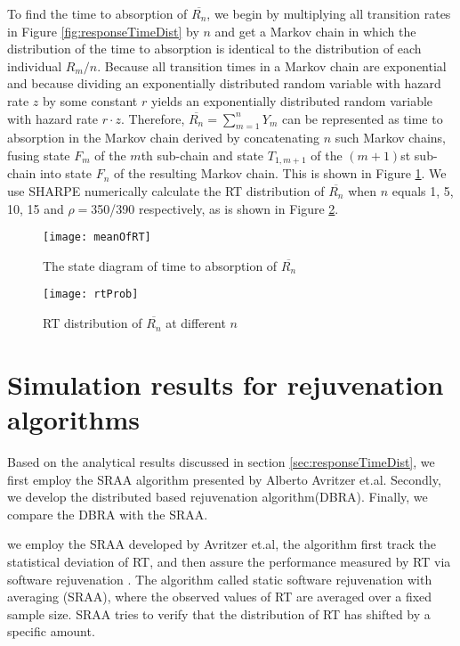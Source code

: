 \documentclass[10pt,journal,letterpaper,compsoc]{IEEEtran}
\begin{document}
To find the time to absorption of $\overline{R_n}$,
we begin by multiplying all transition rates
in Figure \ref{fig:responseTimeDist} by $n$ and get a Markov chain
in which the distribution of the time to absorption is identical to
the distribution of each individual $R_m/n$.
Because all transition times in a Markov chain are exponential and 
because dividing an exponentially distributed random variable with
hazard rate $z$ by some constant $r$ yields an exponentially distributed
random variable with hazard rate $r \cdot z$.
Therefore, $\overline{R_n}=\sum_{m=1}^nY_m$ can be represented as time
to absorption in the Markov chain derived by concatenating $n$ such
Markov chains, fusing state $F_m$ of the $m$th sub-chain and state
$T_{1,m+1}$ of the $(m+1)$st sub-chain into state $F_n$
of the resulting Markov chain.
This is shown in Figure \ref{fig:meanOfRT}.
We use SHARPE numerically calculate the RT distribution of $\overline{R_n}$
when $n$ equals 1, 5, 10, 15 and $\rho=$350/390 respectively,
as is shown in Figure \ref{fig:RTdist}.

\begin{figure}[htb]
\centering
\texttt{[image: meanOfRT]}
\caption{The state diagram of time to absorption of $\overline{R_n}$}
\label{fig:meanOfRT}
\end{figure}

\begin{figure}[htb]
\centering
\texttt{[image: rtProb]}
\caption{RT distribution of $\overline{R_n}$ at different $n$}
\label{fig:RTdist}
\end{figure}

\section{Simulation results for rejuvenation algorithms} %
\label{sec:simResults}
Based on the analytical results discussed
in section \ref{sec:responseTimeDist},
we first employ the SRAA algorithm presented by Alberto Avritzer et.al.
Secondly, we develop the distributed based rejuvenation algorithm(DBRA).
Finally, we compare the DBRA with the SRAA.


we employ the SRAA developed by Avritzer et.al,
the algorithm first track the statistical deviation of RT,
and then assure the performance measured by RT via
software rejuvenation \cite{ChScience:AAvritzer2006DSN}.
The algorithm called static software rejuvenation with averaging
(SRAA), where the observed values of RT are averaged over a fixed
sample size.
SRAA tries to verify that the distribution of RT
has shifted by a specific amount.
\end{document}
